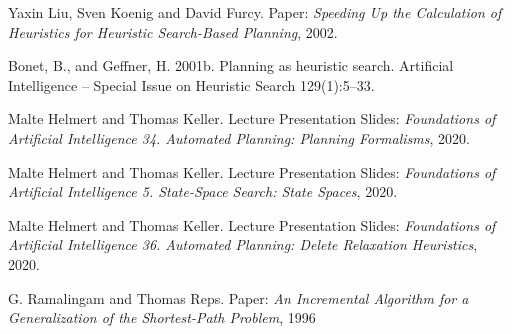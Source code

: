 \begin{thebibliography}{9}
Yaxin Liu, Sven Koenig and David Furcy. Paper: \textit{Speeding Up the Calculation of Heuristics
for Heuristic Search-Based Planning}, 2002.

Bonet, B., and Geffner, H. 2001b. Planning as heuristic
search. Artificial Intelligence – Special Issue on Heuristic Search 129(1):5–33.

Malte Helmert and Thomas Keller. Lecture Presentation Slides: \textit{Foundations of Artificial Intelligence 34. Automated Planning: Planning Formalisms}, 2020.

Malte Helmert and Thomas Keller. Lecture Presentation Slides: \textit{Foundations of Artificial Intelligence
5. State-Space Search: State Spaces}, 2020.

Malte Helmert and Thomas Keller. Lecture Presentation Slides: \textit{Foundations of Artificial Intelligence 36. Automated Planning: Delete Relaxation Heuristics}, 2020.

G. Ramalingam and Thomas Reps. Paper: \textit{An Incremental Algorithm for a Generalization of the Shortest-Path Problem}, 1996
\end{thebibliography}